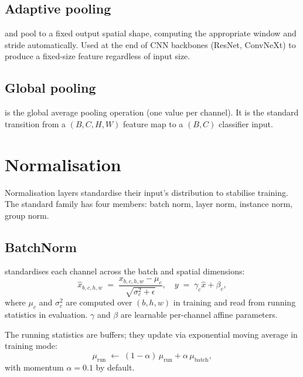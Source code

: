 \subsection{Adaptive pooling}
\label{ssec:linear_conv_norm:adaptive_pool}

 and
 pool to a fixed output
spatial shape, computing the appropriate window and stride
automatically. Used at the end of CNN backbones (ResNet, ConvNeXt)
to produce a fixed-size feature regardless of input size.

\subsection{Global pooling}
\label{ssec:linear_conv_norm:global_pool}

 is the global average pooling
operation (one value per channel). It is the standard transition
from a $(B, C, H, W)$ feature map to a $(B, C)$ classifier input.

\section{Normalisation}
\label{sec:linear_conv_norm:norm}

Normalisation layers standardise their input's distribution to
stabilise training. The standard family has four members:
batch norm, layer norm, instance norm, group norm.

\subsection{BatchNorm}
\label{ssec:linear_conv_norm:batchnorm}

 \cite{ioffe_batchnorm_2015}
standardises each channel across the batch and spatial dimensions:
\[
\hat x_{b, c, h, w} \;=\; \frac{x_{b, c, h, w} - \mu_c}{\sqrt{\sigma_c^2 + \epsilon}},
\quad y \;=\; \gamma_c \hat x + \beta_c,
\]
where $\mu_c$ and $\sigma_c^2$ are computed over $(b, h, w)$ in
training and read from running statistics in evaluation. $\gamma$
and $\beta$ are learnable per-channel affine parameters.

The running statistics are buffers; they update via exponential
moving average in training mode:
\[
\mu_{\text{run}} \;\leftarrow\; (1 - \alpha)\,\mu_{\text{run}} + \alpha\,\mu_{\text{batch}},
\]
with momentum $\alpha = 0.1$ by default.

